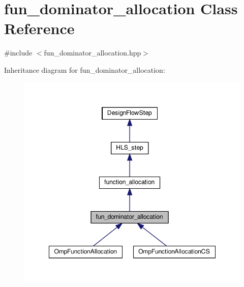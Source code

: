 \hypertarget{classfun__dominator__allocation}{}\section{fun\+\_\+dominator\+\_\+allocation Class Reference}
\label{classfun__dominator__allocation}


{\ttfamily \#include $<$fun\+\_\+dominator\+\_\+allocation.\+hpp$>$}



Inheritance diagram for fun\+\_\+dominator\+\_\+allocation\+:
\nopagebreak
\begin{figure}[H]
\begin{center}
\leavevmode
\includegraphics[width=348pt]{d5/dda/classfun__dominator__allocation__inherit__graph}
\end{center}
\end{figure}


